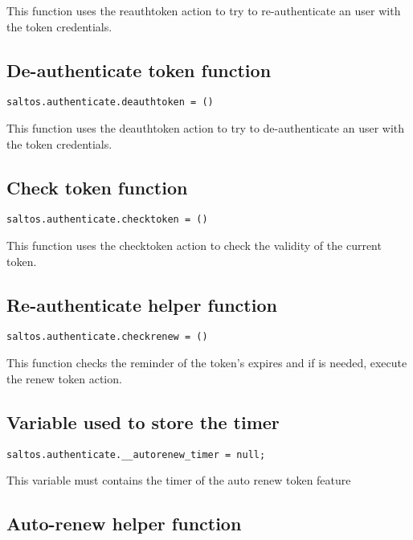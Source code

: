 \documentclass[a4paper]{book}
\begin{document}
This function uses the reauthtoken action to try to re-authenticate an user with the token
credentials.

\hypertarget{toc415}{}
\subsection{De-authenticate token function}

\begin{lstlisting}
saltos.authenticate.deauthtoken = ()
\end{lstlisting}

This function uses the deauthtoken action to try to de-authenticate an user with the token
credentials.

\hypertarget{toc416}{}
\subsection{Check token function}

\begin{lstlisting}
saltos.authenticate.checktoken = ()
\end{lstlisting}

This function uses the checktoken action to check the validity of the current token.

\hypertarget{toc417}{}
\subsection{Re-authenticate helper function}

\begin{lstlisting}
saltos.authenticate.checkrenew = ()
\end{lstlisting}

This function checks the reminder of the token's expires and if is needed, execute the renew
token action.

\hypertarget{toc418}{}
\subsection{Variable used to store the timer}

\begin{lstlisting}
saltos.authenticate.__autorenew_timer = null;
\end{lstlisting}

This variable must contains the timer of the auto renew token feature

\hypertarget{toc419}{}
\subsection{Auto-renew helper function}
\end{document}
